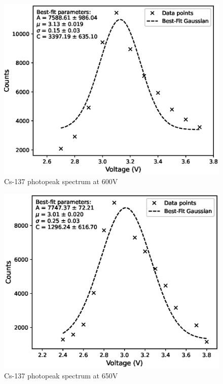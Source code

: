 \begin{figure}[H]
    \centering
    \includegraphics[width=0.9\columnwidth]{images/600.eps}
    \caption{Cs-137 photopeak spectrum at 600V}
    \label{600}
\end{figure}

\begin{figure}[H]
    \centering
    \includegraphics[width=0.9\columnwidth]{images/650.eps}
    \caption{Cs-137 photopeak spectrum at 650V}
    \label{650}
\end{figure}

